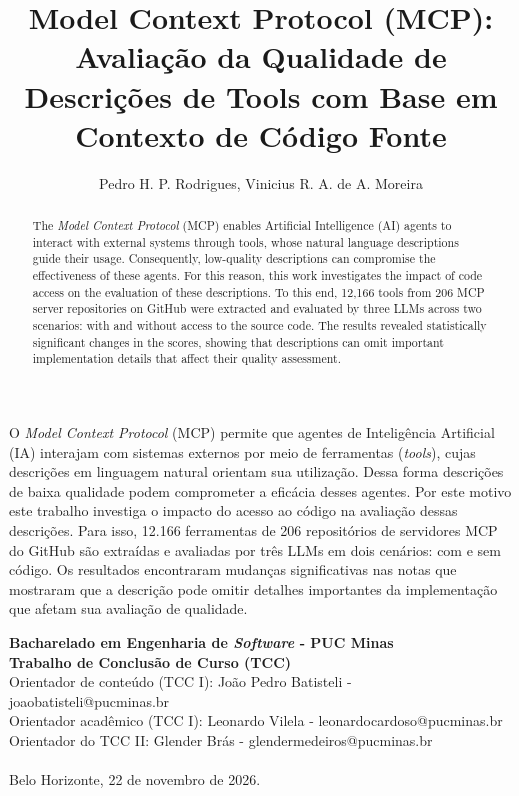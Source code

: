 \documentclass[12pt]{article}
\title{Model Context Protocol (MCP): Avaliação da Qualidade de Descrições de Tools com Base em Contexto de Código Fonte }
\author{Pedro H. P. Rodrigues\inst{1}, Vinicius R. A. de A. Moreira\inst{1}
}
\begin{document}
 

\maketitle

\begin{resumo}
O \textit{Model Context Protocol} (MCP) permite que agentes de Inteligência Artificial (IA) interajam com sistemas externos por meio de ferramentas (\textit{tools}), cujas descrições em linguagem natural orientam sua utilização. Dessa forma descrições de baixa qualidade podem comprometer a eficácia desses agentes. Por este motivo este trabalho investiga o impacto do acesso ao código na avaliação dessas descrições. Para isso, 12.166 ferramentas de 206 repositórios de servidores MCP do GitHub são extraídas e avaliadas por três LLMs em dois cenários: com e sem código. Os resultados encontraram mudanças significativas nas notas que mostraram que a descrição pode omitir detalhes importantes da implementação que afetam sua avaliação de qualidade.
\end{resumo}

\begin{abstract}
The \textit{Model Context Protocol} (MCP) enables Artificial Intelligence (AI) agents to interact with external systems through tools, whose natural language descriptions guide their usage. Consequently, low-quality descriptions can compromise the effectiveness of these agents. For this reason, this work investigates the impact of code access on the evaluation of these descriptions. To this end, 12,166 tools from 206 MCP server repositories on GitHub were extracted and evaluated by three LLMs across two scenarios: with and without access to the source code. The results revealed statistically significant changes in the scores, showing that descriptions can omit important implementation details that affect their quality assessment.
\end{abstract}


\begin{tcolorbox}
\footnotesize
\textbf{Bacharelado em Engenharia de \emph{Software} - PUC Minas\\
Trabalho de Conclusão de Curso (TCC)} \\

\indent 
Orientador de conteúdo (TCC I): João Pedro Batisteli - joaobatisteli@pucminas.br\\
Orientador acadêmico (TCC I): Leonardo Vilela - leonardocardoso@pucminas.br \\
Orientador do TCC II: Glender Brás - glendermedeiros@pucminas.br\\ \\
Belo Horizonte, 22 de novembro de 2026.
\end{tcolorbox}
\end{document}

